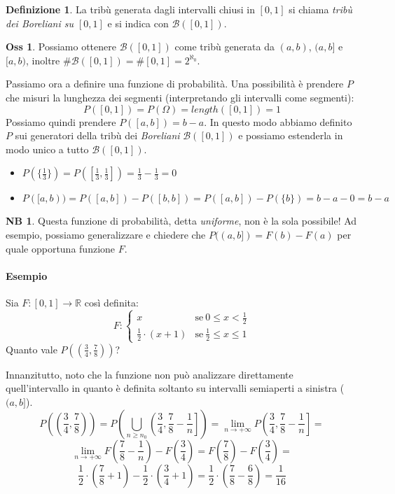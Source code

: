 \documentclass[12pt, a4paper]{report}
\theoremstyle{definition}
\newtheorem{definition}{Definizione}[section]
\newtheorem*{observation}{Oss}
\newtheorem*{note}{NB}
\DeclareRobustCommand{\R}{\mathbb{R}}%
\DeclareRobustCommand{\B}{\mathcal{B}}%
\begin{document}
\begin{definition}
	La tribù generata dagli intervalli chiusi in $[0,1]$ si chiama \emph{tribù
	dei Boreliani su $[0,1]$} e si indica con \(\B([0,1])\).
\end{definition}
\begin{observation}
	Possiamo ottenere \(\B([0,1])\) come tribù generata da $(a,b)$,
	$(a,b]$ e $[a,b)$, inoltre \(\#\B([0,1])=\#[0,1]=2^{\aleph_0}\).
\end{observation}

\newpage
Passiamo ora a definire una funzione di probabilità. Una possibilità è prendere
$P$ che misuri la lunghezza dei segmenti (interpretando gli intervalli come
segmenti):
\[P([0,1])=P(\Omega)=length([0,1])=1\]
Possiamo quindi prendere \(P([a,b])=b-a\). In questo modo abbiamo definito $P$
sui generatori della tribù dei \emph{Boreliani} \(\B([0,1])\) e possiamo
estenderla in modo unico a tutto \(\B([0,1])\).
\begin{itemize}
	\item \(P(\{\frac{1}{3}\})=P([\frac{1}{3}, \frac{1}{3}])=\frac{1}{3}-\frac{1}{3}=0\)
	\item \(P([a,b))=P([a,b])-P([b,b])=P([a,b])-P(\{b\})=b-a-0=b-a\)
\end{itemize}
\begin{note}
	Questa funzione di probabilità, detta \emph{uniforme}, non è la sola possibile!
	Ad esempio, possiamo generalizzare e chiedere che \(P((a,b])=F(b)-F(a)\) per
	quale opportuna funzione $F$.
\end{note}

\paragraph*{Esempio}
Sia \(F:[0,1]\rightarrow\R\) così definita:
\[F:\begin{cases}
	{x} & \text{se}\ {0\leq x<\frac{1}{2}}\\
	{\frac{1}{2}\cdot (x+1)} & \text{se}\ {\frac{1}{2}\leq x\leq 1}
\end{cases}\]
Quanto vale \(P((\frac{3}{4},\frac{7}{8}))\)?

Innanzitutto, noto che la funzione non può analizzare direttamente quell'intervallo
in quanto è definita soltanto su intervalli semiaperti a sinistra ($(a,b]$).
\[P\left(\left(\frac{3}{4},\frac{7}{8}\right)\right)=
P\left(\bigcup_{n\geq n_0}\left(\frac{3}{4},\frac{7}{8}-\frac{1}{n}\right]\right)=
\lim_{n\rightarrow +\infty}P\left(\frac{3}{4}, \frac{7}{8}-\frac{1}{n}\right]=\]
\[\lim_{n\rightarrow +\infty}F\left(\frac{7}{8}-\frac{1}{n}\right)-F\left(\frac{3}{4}\right)=
F\left(\frac{7}{8}\right)-F\left(\frac{3}{4}\right)=\]
\[\frac{1}{2}\cdot \left(\frac{7}{8} + 1\right)-\frac{1}{2}\cdot \left(\frac{3}{4}+1\right)=
\frac{1}{2}\cdot \left(\frac{7}{8}-\frac{6}{8}\right)=\frac{1}{16}\]
\end{document}
